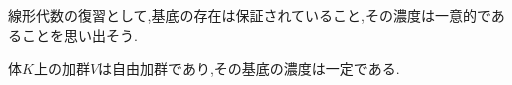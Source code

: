 線形代数の復習として,基底の存在は保証されていること,その濃度は一意的であることを思い出そう.
\begin{thm}
	体$K$上の加群$V$は自由加群であり,その基底の濃度は一定である.
\end{thm}
%		
%			
%			

